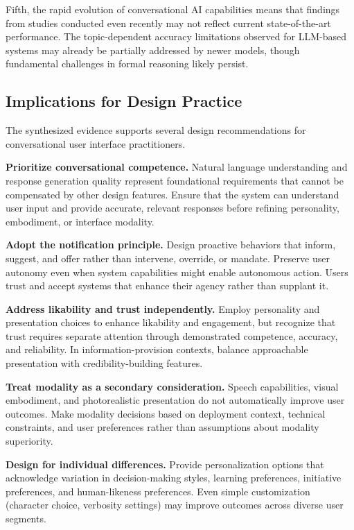 \documentclass[manuscript,anonymous,sigconf]{acmart}
\begin{document}
Fifth, the rapid evolution of conversational AI capabilities means that findings from studies conducted even recently may not reflect current state-of-the-art performance. The topic-dependent accuracy limitations observed for LLM-based systems \cite{A81} may already be partially addressed by newer models, though fundamental challenges in formal reasoning likely persist.

\subsection{Implications for Design Practice}

The synthesized evidence supports several design recommendations for conversational user interface practitioners.

\textbf{Prioritize conversational competence.} Natural language understanding and response generation quality represent foundational requirements that cannot be compensated by other design features. Ensure that the system can understand user input and provide accurate, relevant responses before refining personality, embodiment, or interface modality.

\textbf{Adopt the notification principle.} Design proactive behaviors that inform, suggest, and offer rather than intervene, override, or mandate. Preserve user autonomy even when system capabilities might enable autonomous action. Users trust and accept systems that enhance their agency rather than supplant it.

\textbf{Address likability and trust independently.} Employ personality and presentation choices to enhance likability and engagement, but recognize that trust requires separate attention through demonstrated competence, accuracy, and reliability. In information-provision contexts, balance approachable presentation with credibility-building features.

\textbf{Treat modality as a secondary consideration.} Speech capabilities, visual embodiment, and photorealistic presentation do not automatically improve user outcomes. Make modality decisions based on deployment context, technical constraints, and user preferences rather than assumptions about modality superiority.

\textbf{Design for individual differences.} Provide personalization options that acknowledge variation in decision-making styles, learning preferences, initiative preferences, and human-likeness preferences. Even simple customization (character choice, verbosity settings) may improve outcomes across diverse user segments.
\end{document}
